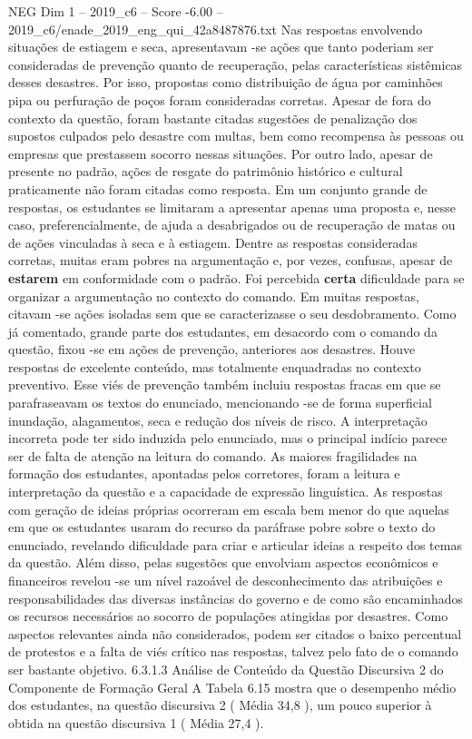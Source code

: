 \begin{textsample}{NEG Dim 1 – 2019\_c6 – Score -6.00 – 2019\_c6/enade\_2019\_eng\_qui\_42a8487876.txt}
Nas respostas envolvendo situações de estiagem e seca, apresentavam -se ações que tanto poderiam ser consideradas de prevenção quanto de recuperação, pelas características sistêmicas desses desastres.
Por isso, propostas como distribuição de água por caminhões pipa ou perfuração de poços foram consideradas corretas.
Apesar de fora do contexto da questão, foram bastante citadas sugestões de penalização dos supostos culpados pelo desastre com multas, bem como recompensa às pessoas ou empresas que prestassem socorro nessas situações.
Por outro lado, apesar de presente no padrão, ações de resgate do patrimônio histórico e cultural praticamente não foram citadas como resposta.
Em um conjunto grande de respostas, os estudantes se limitaram a apresentar apenas uma proposta e, nesse caso, preferencialmente, de ajuda a desabrigados ou de recuperação de matas ou de ações vinculadas à seca e à estiagem.
Dentre as respostas consideradas corretas, muitas eram pobres na argumentação e, por vezes, confusas, apesar de \textbf{estarem} em conformidade com o padrão.
Foi percebida \textbf{certa} dificuldade para se organizar a argumentação no contexto do comando.
Em muitas respostas, citavam -se ações isoladas sem que se caracterizasse o seu desdobramento.
Como já comentado, grande parte dos estudantes, em desacordo com o comando da questão, fixou -se em ações de prevenção, anteriores aos desastres.
Houve respostas de excelente conteúdo, mas totalmente enquadradas no contexto preventivo.
Esse viés de prevenção também incluiu respostas fracas em que se parafraseavam os textos do enunciado, mencionando -se de forma superficial inundação, alagamentos, seca e redução dos níveis de risco.
A interpretação incorreta pode ter sido induzida pelo enunciado, mas o principal indício parece ser de falta de atenção na leitura do comando.
As maiores fragilidades na formação dos estudantes, apontadas pelos corretores, foram a leitura e interpretação da questão e a capacidade de expressão linguística.
As respostas com geração de ideias próprias ocorreram em escala bem menor do que aquelas em que os estudantes usaram do recurso da paráfrase pobre sobre o texto do enunciado, revelando dificuldade para criar e articular ideias a respeito dos temas da questão.
Além disso, pelas sugestões que envolviam aspectos econômicos e financeiros revelou -se um nível razoável de desconhecimento das atribuições e responsabilidades das diversas instâncias do governo e de como são encaminhados os recursos necessários ao socorro de populações atingidas por desastres.
Como aspectos relevantes ainda não considerados, podem ser citados o baixo percentual de protestos e a falta de viés crítico nas respostas, talvez pelo fato de o comando ser bastante objetivo. 6.3.1.3 Análise de Conteúdo da Questão Discursiva 2 do Componente de Formação Geral A Tabela 6.15 mostra que o desempenho médio dos estudantes, na questão discursiva 2 ( Média 34,8 ), um pouco superior à obtida na questão discursiva 1 ( Média 27,4 ).

\end{textsample}
